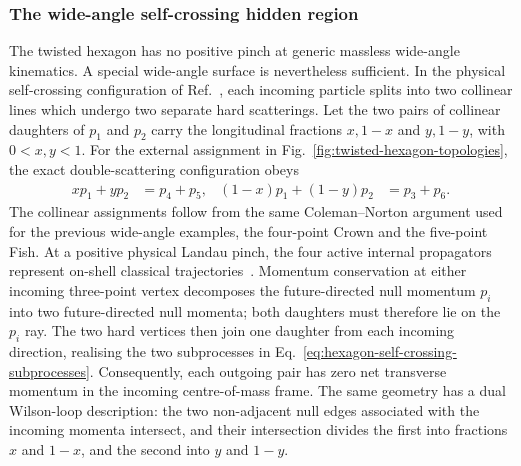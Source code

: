 \documentclass[a4paper,11pt]{article}
\begin{document}
\subsubsection{The wide-angle self-crossing hidden region}
\label{sec:six-point-wide-angle-self-crossing}
The twisted hexagon has no positive pinch at generic massless wide-angle
kinematics.  A special wide-angle surface is nevertheless sufficient.  In the
physical self-crossing configuration of Ref.~\cite{Dixon:2016selfcross}, each
incoming particle splits into two collinear lines which undergo two separate
hard scatterings.  Let the two pairs of collinear daughters of \(p_1\) and
\(p_2\) carry the longitudinal fractions \(x,1-x\) and \(y,1-y\), with
\(0<x,y<1\).  For the external assignment in
Fig.~\ref{fig:twisted-hexagon-topologies}, the exact double-scattering
configuration obeys
\begin{equation}
 \begin{aligned}
  xp_1+yp_2&=p_4+p_5,&
  (1-x)p_1+(1-y)p_2&=p_3+p_6 .
 \end{aligned}
 \label{eq:hexagon-self-crossing-subprocesses}
\end{equation}
The collinear assignments follow from the same Coleman--Norton argument used
for the previous wide-angle examples, the four-point Crown and the five-point
Fish.  At a positive physical Landau pinch, the
four active internal propagators represent on-shell classical
trajectories~\cite{Coleman:1965cn,Collins:2020euz}.  Momentum conservation at
either incoming three-point vertex decomposes the future-directed null
momentum \(p_i\) into two future-directed null momenta; both daughters must
therefore lie on the \(p_i\) ray.  The two hard vertices then join one daughter
from each incoming direction, realising the two subprocesses in
Eq.~\eqref{eq:hexagon-self-crossing-subprocesses}.  Consequently, each
outgoing pair has zero net transverse momentum in the incoming
centre-of-mass frame.  The same geometry has a dual Wilson-loop description:
the two non-adjacent null edges associated with the incoming momenta intersect,
and their intersection divides the first into fractions \(x\) and \(1-x\),
and the second into \(y\) and \(1-y\).
\end{document}
